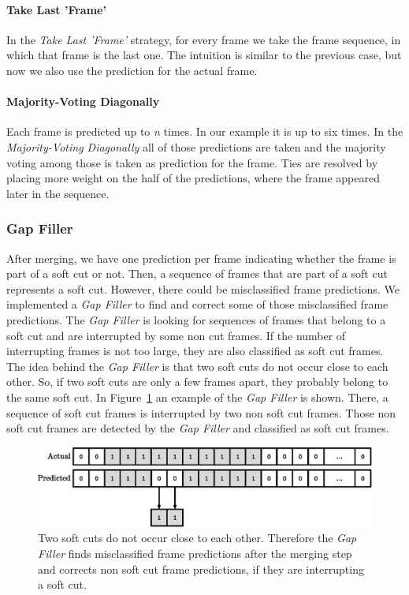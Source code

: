 \paragraph{Take Last 'Frame'}
In the \textit{Take Last 'Frame'} strategy, for every frame we take the frame sequence, in which that frame is the last one.
The intuition is similar to the previous case, but now we also use the prediction for the actual frame.

\paragraph{Majority-Voting Diagonally}
Each frame is predicted up to \textit{n} times.
In our example it is up to six times.
In the \textit{Majority-Voting Diagonally} all of those predictions are taken and the majority voting among those is taken as prediction for the frame.
Ties are resolved by placing more weight on the half of the predictions, where the frame appeared later in the sequence.

\subsubsection{Gap Filler}
After merging, we have one prediction per frame indicating whether the frame is part of a soft cut or not.
Then, a sequence of frames that are part of a soft cut represents a soft cut.
However, there could be misclassified frame predictions.
We implemented a \textit{Gap Filler} to find and correct some of those misclassified frame predictions.
The \textit{Gap Filler} is looking for sequences of frames that belong to a soft cut and are interrupted by some non cut frames.
If the number of interrupting frames is not too large, they are also classified as soft cut frames.
The idea behind the \textit{Gap Filler} is that two soft cuts do not occur close to each other.
So, if two soft cuts are only a few frames apart, they probably belong to the same soft cut.
In Figure~\ref{fig:gap_filler} an example of the \textit{Gap Filler} is shown.
There, a sequence of soft cut frames is interrupted by two non soft cut frames.
Those non soft cut frames are detected by the \textit{Gap Filler} and classified as soft cut frames.
\begin{figure}[!htb]
	\centering
	\includegraphics[scale=.7]{images/gap_filler.eps}
	\caption{Two soft cuts do not occur close to each other. Therefore the \textit{Gap Filler} finds misclassified frame predictions after the merging step and corrects non soft cut frame predictions, if they are interrupting a soft cut.}
	\label{fig:gap_filler}
\end{figure}

